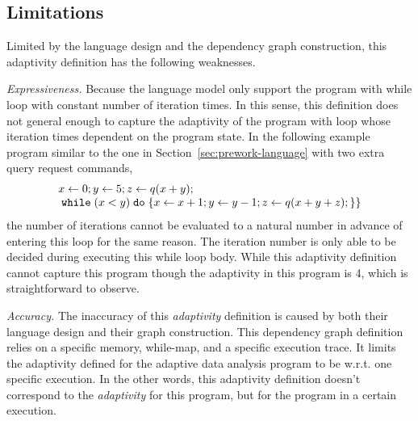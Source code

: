 \subsection{Limitations}
Limited by the language design and the dependency graph construction,
this adaptivity definition has the following weaknesses.

\emph{Expressiveness.}
Because the language model only support the program with while loop with constant number of iteration times.
In this sense, this definition does not general enough to capture the adaptivity of the program with loop whose iteration times dependent on the program state. 
 In the following example program similar to the one in Section~\ref{sec:prework-language} with two extra query request commands,
 \[
    \begin{array}{l}
 { \mathrel{ x \leftarrow 0 } };
 \mathrel{ y \leftarrow 5 };
 \mathrel{ z \leftarrow q(x + y) };\\
 \;\mathtt{while}\; (x < y) \;\mathtt{do}\; 
 \{
 \mathrel{ x \leftarrow x + 1 };
 \mathrel{ y \leftarrow y - 1 };
 \mathrel{ z \leftarrow q(x+y+z) };
 \}\}
    \end{array}
 \] 
 the number of iterations cannot be evaluated to a natural number in advance of entering this loop for the same reason. 
 The iteration number is only
 able to be decided during executing this while loop body.
 While this adaptivity definition cannot capture this program though the adaptivity in this program is 4, which is straightforward to observe.

 \emph{Accuracy.}
 The inaccuracy of this \emph{adaptivity} definition is caused by both their language design and their graph construction.
 This dependency graph definition relies on a specific memory, while-map, and a specific execution trace.
 It limits the adaptivity defined for the adaptive data analysis program to be w.r.t. one specific
 execution.
 In the other words, this adaptivity definition doesn't correspond to the \emph{adaptivity} for this program,
 but for the program in a certain execution.

